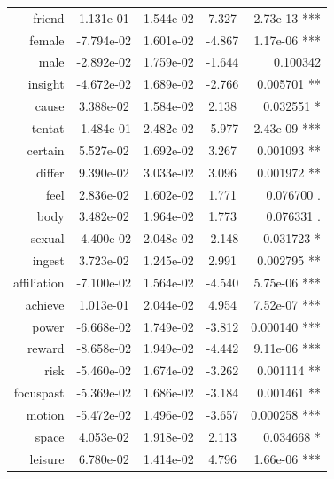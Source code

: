 \documentclass[bsc,frontabs,twoside,singlespacing,parskip,deptreport]{infthesis}
\begin{document}
\begin{table}[p]
{\begin{tabular}{rcccr}
friend      & 1.131e-01  & 1.544e-02  & 7.327   & 2.73e-13 ***                        \\
female      & -7.794e-02 & 1.601e-02  & -4.867  & 1.17e-06 ***                        \\
male        & -2.892e-02 & 1.759e-02  & -1.644  & 0.100342                            \\
insight     & -4.672e-02 & 1.689e-02  & -2.766  & 0.005701 **                         \\
cause       & 3.388e-02  & 1.584e-02  & 2.138   & 0.032551 *                          \\
tentat      & -1.484e-01 & 2.482e-02  & -5.977  & 2.43e-09 ***                        \\
certain     & 5.527e-02  & 1.692e-02  & 3.267   & 0.001093 **                         \\
differ      & 9.390e-02  & 3.033e-02  & 3.096   & 0.001972 **                         \\
feel        & 2.836e-02  & 1.602e-02  & 1.771   & 0.076700 .                          \\
body        & 3.482e-02  & 1.964e-02  & 1.773   & 0.076331 .                          \\
sexual      & -4.400e-02 & 2.048e-02  & -2.148  & 0.031723 *                          \\
ingest      & 3.723e-02  & 1.245e-02  & 2.991   & 0.002795 **                         \\
affiliation & -7.100e-02 & 1.564e-02  & -4.540  & 5.75e-06 ***                        \\
achieve     & 1.013e-01  & 2.044e-02  & 4.954   & 7.52e-07 ***                        \\
power       & -6.668e-02 & 1.749e-02  & -3.812  & 0.000140 ***                        \\
reward      & -8.658e-02 & 1.949e-02  & -4.442  & 9.11e-06 ***                        \\
risk        & -5.460e-02 & 1.674e-02  & -3.262  & 0.001114 **                         \\
focuspast   & -5.369e-02 & 1.686e-02  & -3.184  & 0.001461 **                         \\
motion      & -5.472e-02 & 1.496e-02  & -3.657  & 0.000258 ***                        \\
space       & 4.053e-02  & 1.918e-02  & 2.113   & 0.034668 *                          \\
leisure     & 6.780e-02  & 1.414e-02  & 4.796   & 1.66e-06 ***                        \\

\end{tabular}}
\end{table}
\end{document}
